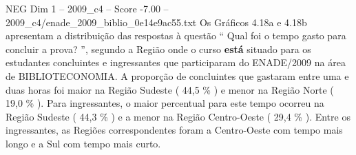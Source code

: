 \begin{textsample}{NEG Dim 1 – 2009\_c4 – Score -7.00 – 2009\_c4/enade\_2009\_biblio\_0e14e9ac55.txt}
Os Gráficos 4.18a e 4.18b apresentam a distribuição das respostas à questão “ Qual foi o tempo gasto para concluir a prova? ”, segundo a Região onde o curso \textbf{está} situado para os estudantes concluintes e ingressantes que participaram do ENADE/2009 na área de BIBLIOTECONOMIA.
A proporção de concluintes que gastaram entre uma e duas horas foi maior na Região Sudeste ( 44,5 \% ) e menor na Região Norte ( 19,0 \% ).
Para ingressantes, o maior percentual para este tempo ocorreu na Região Sudeste ( 44,3 \% ) e a menor na Região Centro-Oeste ( 29,4 \% ).
Entre os ingressantes, as Regiões correspondentes foram a Centro-Oeste com tempo mais longo e a Sul com tempo mais curto.

\end{textsample}
